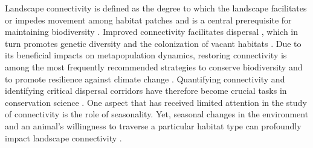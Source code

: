 \documentclass[../FinalThesis.tex]{subfiles}
\begin{document}

Landscape connectivity is defined as the degree to which the landscape
facilitates or impedes movement among habitat patches \citep{Taylor.1993} and is
a central prerequisite for maintaining biodiversity \citep{Fahrig.2003}.
Improved connectivity facilitates dispersal \citep{Doerr.2011, Baguette.2013},
which in turn promotes genetic diversity \citep{Perrin.2000, Frankham.2002} and
the colonization of vacant habitats \citep{Hanski.1999, MacArthur.2001}. Due to
its beneficial impacts on metapopulation dynamics, restoring connectivity is
among the most frequently recommended strategies to conserve biodiversity and to
promote resilience against climate change \citep{Heller.2009, Rudnick.2012}.
Quantifying connectivity and identifying critical dispersal corridors have
therefore become crucial tasks in conservation science \citep{Heller.2009,
Rudnick.2012, Keeley.2019, Hofmann.2021}. One aspect that has received limited
attention in the study of connectivity is the role of seasonality. Yet, seasonal
changes in the environment and an animal's willingness to traverse a particular
habitat type can profoundly impact landscape connectivity \citep{Zeller.2020a}.

\end{document}
